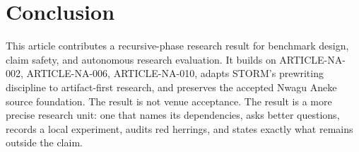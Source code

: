 \documentclass[sigconf,nonacm]{acmart}
\begin{document}
\section{Conclusion}
This article contributes a recursive-phase research result for benchmark design, claim safety, and autonomous research evaluation. It
builds on ARTICLE-NA-002, ARTICLE-NA-006, ARTICLE-NA-010, adapts STORM's prewriting discipline to artifact-first
research, and preserves the accepted Nwagu Aneke source foundation. The result
is not venue acceptance. The result is a more precise research unit:
one that names its dependencies, asks better questions, records a local
experiment, audits red herrings, and states exactly what remains outside the
claim.



\end{document}
